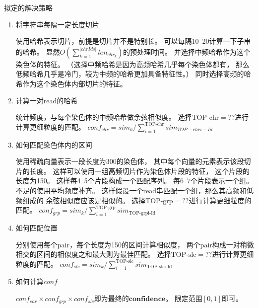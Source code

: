 \documentclass[hyperref,UTF8]{ctexart}
\theoremstyle{definition}
\theoremstyle{remark}
\numberwithin{equation}{subsection}
\newcommand{\Emph}{\textbf}
\begin{document}
	拟定的解决策略
	\begin{enumerate}
	
		\item 将字符串每隔一定长度切片
		
		使用哈希表示切片，前提是切片并不是特别长。
		可以每隔10~20计算一下子串的哈希。
		显然$O(\sum_{k=1}^{|chrIds|}{len_{chr_k}})$的预处理时间。
		并选择中频哈希作为这个染色体的特征。
		（选择中频哈希是因为高频哈希几乎每个染色体都有，
		那么低频哈希几乎是冷门，较为中频的哈希更加具备特征性。）
		同时选择高频的哈希作为这个染色体内部切片的特征。
		
		\item 计算一对read的哈希
		
		统计频度，与每个染色体的中频哈希做余弦相似度。
		选择$\text{TOP-chr} = ??$进行计算更细粒度的匹配。
		$conf_{chr} = sim_k / \sum_{i=1}^{\text{TOP-chr}}{sim_{TOP-chri-Id}}$
		
		\item 如何匹配染色体内的区间
		
		使用稀疏向量表示一段长度为300的染色体，
		其中每个向量的元素表示该段切片的长度。
		这样可以使用一组高频切片作为染色体片段的特征，
		这个片段的长度为150。
		这样每4~5个片段构成一个匹配序列。
		每6~7个片段表示一个组。
		不足的使用平均频度补齐。
		这样假设一个read串匹配一个组，那么其高频和低频组成的
		余弦相似度应该是相似的。
        选择$\text{TOP-grp} = ??$进行计算更细粒度的匹配。
		$conf_{grp} = sim_k / \sum_{i=1}^{\text{TOP-grp}}{sim_\text{TOP-grpi-Id}}$
		
		\item 如何匹配位置
		
		分别使用每个pair，每个长度为150的区间计算相似度，
		两个pair构成一对稍微相交的区间的相似度之和最大则为最佳匹配。
		选择$\text{TOP-slc} = ??$进行计算更细粒度的匹配。
		$conf_{slc} = sim_k / \sum_{i=1}^{\text{TOP-slc}}{sim_\text{TOP-slci-Id}}$
		
		\item 如何计算$conf$
		
		$conf_{chr} \times conf_{grp} \times conf_{slc}$即为最终的$\Emph{confidence}$。
		限定范围$[0,1]$即可。
		
	\end{enumerate}
\end{document}
